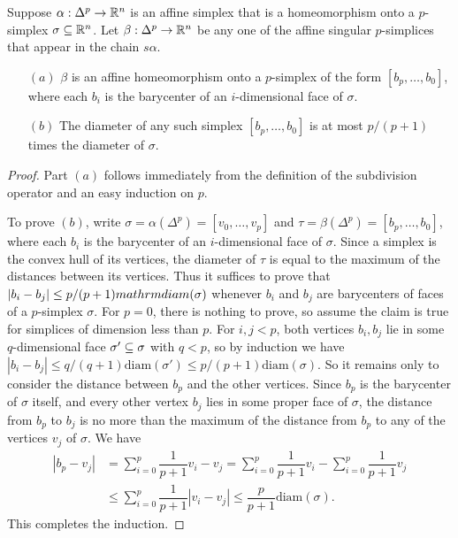 \begin{lemma}\label{subdivision lem}
Suppose $\alpha:\Delta^p\to\mathbb{R}^n$ is an affine simplex that is a homeomorphism
onto a $p$-simplex $\sigma\subseteq\mathbb{R}^n$. Let $\beta:\Delta^p\to\mathbb{R}^n$ be any one of the affine singular $p$-simplices that appear in the chain $s\alpha$.
\begin{itemize}
\item[$(a)$]$\beta$ is an affine homeomorphism onto a $p$-simplex of the form $[b_p,\dots,b_0]$, where each $b_i$ is the barycenter of an $i$-dimensional face of $\sigma$.
\item[$(b)$]The diameter of any such simplex $[b_p,\dots,b_0]$ is at most $p/(p+1)$ times the diameter of $\sigma$.
\end{itemize}
\end{lemma}
\begin{proof}
Part $(a)$ follows immediately from the definition of the subdivision operator
and an easy induction on $p$.\par
To prove $(b)$, write $\sigma=\alpha(\Delta^p)=[v_0,\dots,v_p]$ and $\tau=\beta(\Delta^p)=[b_p,\dots,b_0]$, where each $b_i$ is the barycenter of an $i$-dimensional face of $\sigma$. Since a simplex is the convex hull of its vertices, the diameter of $\tau$ is equal to the maximum of the distances between its vertices. Thus it suffices to prove that $|b_i-b_j|\leq p/(p+1)\\mathrm{diam}(\sigma)$ whenever $b_i$ and $b_j$ are barycenters of faces of a $p$-simplex $\sigma$. For $p=0$, there is nothing to prove, so assume the claim is true for simplices of dimension less than $p$. For $i,j<p$, both vertices $b_i,b_j$ lie in some $q$-dimensional face $\sigma'\subseteq\sigma$ with $q<p$, so by induction we have $|b_i-b_j|\leq q/(q+1)\mathrm{diam}(\sigma')\leq p/(p+1)\mathrm{diam}(\sigma)$. So it remains only to consider the distance between $b_p$ and the other vertices. Since $b_p$ is the barycenter of $\sigma$ itself, and every other vertex $b_j$ lies in some proper face of $\sigma$, the distance from $b_p$ to $b_j$ is no more than the maximum of the distance from $b_p$ to any of the vertices $v_j$ of $\sigma$. We have
\begin{align*}
|b_p-v_j|&=\sum_{i=0}^{p}\dfrac{1}{p+1}v_i-v_j=\sum_{i=0}^{p}\dfrac{1}{p+1}v_i-\sum_{i=0}^{p}\dfrac{1}{p+1}v_j\\
&\leq\sum_{i=0}^{p}\dfrac{1}{p+1}|v_i-v_j|\leq\dfrac{p}{p+1}\mathrm{diam}(\sigma).
\end{align*}
This completes the induction.
\end{proof}
